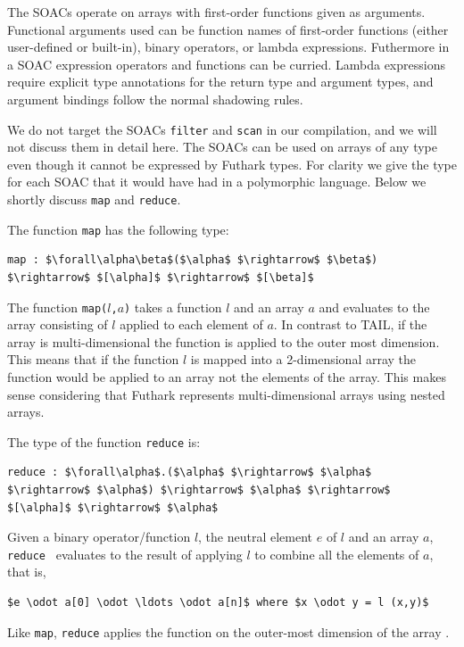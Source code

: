 \documentclass[11pt]{article}
\begin{document}
The SOACs operate on arrays with first-order functions given as arguments.
Functional arguments used can be function names of first-order functions (either user-defined or built-in), 
binary operators, or lambda expressions.
Futhermore in a SOAC expression operators and functions can be curried. Lambda expressions require explicit type annotations for
the return type and argument types, and argument bindings follow the normal shadowing rules.

We do not target the SOACs {\tt filter} and {\tt scan} in our compilation, and we will not discuss them in detail here.
The SOACs can be used on arrays of any type even though it cannot be expressed by Futhark types. For clarity we give the type for each SOAC that it would have had in a polymorphic language.
Below we shortly discuss {\tt map} and {\tt reduce}.

The function {\tt map} has the following type: 
\begin{lstlisting}[numbers=none,frame=none]
map : $\forall\alpha\beta$($\alpha$ $\rightarrow$ $\beta$) $\rightarrow$ $[\alpha]$ $\rightarrow$ $[\beta]$
\end{lstlisting}
The function {\tt map($l$,$a$)} takes a function $l$ and an array $a$ and evaluates to the array consisting of $l$ applied to each element of $a$.
In contrast to TAIL, if the array is multi-dimensional the function is applied to the outer most dimension.
This means that if the function $l$ is mapped into a 2-dimensional array the function would be applied to an array not the elements
of the array. This makes sense considering that Futhark represents multi-dimensional arrays using nested arrays.

The type of the function {\tt reduce} is: 
\begin{lstlisting}[numbers=none,frame=none]
reduce : $\forall\alpha$.($\alpha$ $\rightarrow$ $\alpha$ $\rightarrow$ $\alpha$) $\rightarrow$ $\alpha$ $\rightarrow$ $[\alpha]$ $\rightarrow$ $\alpha$
\end{lstlisting}
Given a binary operator/function $l$, the neutral element $e$ of $l$ and an array $a$,
{\tt reduce } evaluates to the result of applying $l$ to combine all the elements of $a$, that is,
\begin{lstlisting}[numbers=none,frame=none]
$e \odot a[0] \odot \ldots \odot a[n]$ where $x \odot y = l (x,y)$
\end{lstlisting}
Like {\tt map}, {\tt reduce} applies the function on the outer-most dimension of the array \cite{TroelsHenriksen}.
\end{document}

